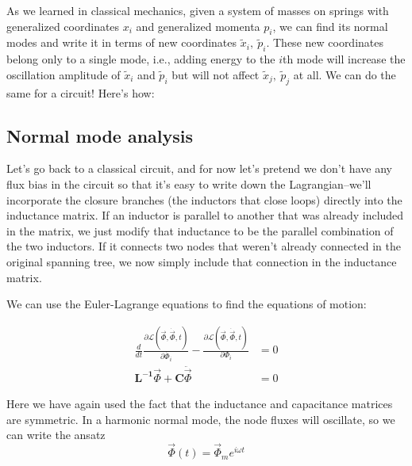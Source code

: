 As we learned in classical mechanics, given a system of masses on springs with generalized coordinates $x_i$ and generalized momenta $p_i$, we can find its normal modes and write it in terms of new coordinates $\tilde{x}_i, \ \tilde{p}_i$. These new coordinates belong only to a single mode, i.e., adding energy to the $i$th mode will increase the oscillation amplitude of $\tilde{x}_i$ and $\tilde{p}_i$ but will not affect $\tilde{x}_j, \ \tilde{p}_j$ at all. We can do the same for a circuit! Here's how:

\subsection{Normal mode analysis}
Let's go back to a classical circuit, and for now let's pretend we don't have any flux bias in the circuit so that it's easy to write down the Lagrangian--we'll incorporate the closure branches (the inductors that close loops) directly into the inductance matrix. If an inductor is parallel to another that was already included in the matrix, we just modify that inductance to be the parallel combination of the two inductors. If it connects two nodes that weren't already connected in the original spanning tree, we now simply include that connection in the inductance matrix.

We can use the Euler-Lagrange equations to find the equations of motion:

\begin{align}
\frac{d}{dt} \frac{\partial \mathcal{L}(\vec{\Phi},\dot{\vec{\Phi}},t)}{\partial \dot{\Phi_i}} - \frac{\partial \mathcal{L}(\vec{\Phi},\dot{\vec{\Phi}},t)}{\partial \Phi_i} &=0 \\
\mathbf{L^{-1}}\vec{\Phi} + \mathbf{C}\ddot{\vec{\Phi}} &=0
\end{align}

Here we have again used the fact that the inductance and capacitance matrices are symmetric. In a harmonic normal mode, the node fluxes will oscillate, so we can write the ansatz
\begin{equation}
\vec{\Phi}(t) = \vec{\Phi}_m e^{i\omega t}
\end{equation}

